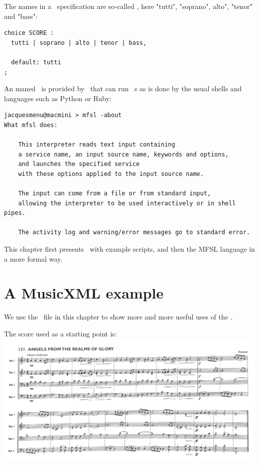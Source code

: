 The names in a \choice\ specification are so-called , here "tutti", "soprano", alto", "tenor" and "bass":
\begin{lstlisting}[language=MFSL]
choice SCORE :
  tutti | soprano | alto | tenor | bass,

  default: tutti
;
\end{lstlisting}

An  maned \mfslExec\ is provided by \mf\, that can run \mfslLang\ \script s as is done by the usual shells and languages such as Python or Ruby:
\begin{lstlisting}[language=Terminal]
jacquesmenu@macmini > mfsl -about
What mfsl does:

    This interpreter reads text input containing
    a service name, an input source name, keywords and options,
    and launches the specified service
    with these options applied to the input source name.

    The input can come from a file or from standard input,
    allowing the interpreter to be used interactively or in shell pipes.

    The activity log and warning/error messages go to standard error.
\end{lstlisting}

This chapter first presents \mfslLang\ with example scripts, and then the MFSL language in a more formal way.


\section{A MusicXML example}

We use the  \mxml\ file in this chapter to show more and more useful uses of the \mfslInterp.

The score used as a starting point is:\\
\includegraphics[scale=0.5]{../mfgraphics/Hymn121_OrigianlScore.png}

